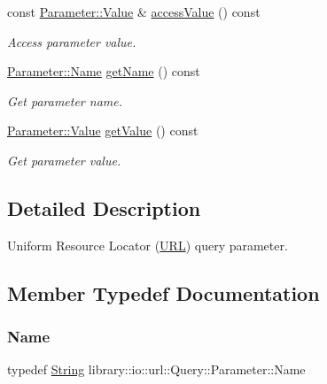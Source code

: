 \begin{DoxyCompactItemize}
const \hyperlink{classlibrary_1_1io_1_1url_1_1_query_1_1_parameter_a46e7a7b97d44f51f83d6261f70ba0a5e}{Parameter\+::\+Value} \& \hyperlink{classlibrary_1_1io_1_1url_1_1_query_1_1_parameter_a6682f28a236dcb764a9e2d0bee4aac8b}{access\+Value} () const
\begin{DoxyCompactList}\small\item\em Access parameter value. \end{DoxyCompactList}\item 
\hyperlink{classlibrary_1_1io_1_1url_1_1_query_1_1_parameter_a7edf5fb8a4ae57aed1ce5dfa2405c981}{Parameter\+::\+Name} \hyperlink{classlibrary_1_1io_1_1url_1_1_query_1_1_parameter_a297c9b89738697c28cc5d223a6c523c7}{get\+Name} () const
\begin{DoxyCompactList}\small\item\em Get parameter name. \end{DoxyCompactList}\item 
\hyperlink{classlibrary_1_1io_1_1url_1_1_query_1_1_parameter_a46e7a7b97d44f51f83d6261f70ba0a5e}{Parameter\+::\+Value} \hyperlink{classlibrary_1_1io_1_1url_1_1_query_1_1_parameter_a9726265cd0f0e84500e65937d5bcd740}{get\+Value} () const
\begin{DoxyCompactList}\small\item\em Get parameter value. \end{DoxyCompactList}\end{DoxyCompactItemize}


\subsection{Detailed Description}
Uniform Resource Locator (\hyperlink{classlibrary_1_1io_1_1_u_r_l}{U\+RL}) query parameter. 

\subsection{Member Typedef Documentation}
\mbox{\label{classlibrary_1_1io_1_1url_1_1_query_1_1_parameter_a7edf5fb8a4ae57aed1ce5dfa2405c981}} 
\subsubsection{\texorpdfstring{Name}{Name}}
{\footnotesize\ttfamily typedef \hyperlink{namespacelibrary_1_1io_a7469b45835a4421045db344d6a5a1f85}{String} library\+::io\+::url\+::\+Query\+::\+Parameter\+::\+Name}

